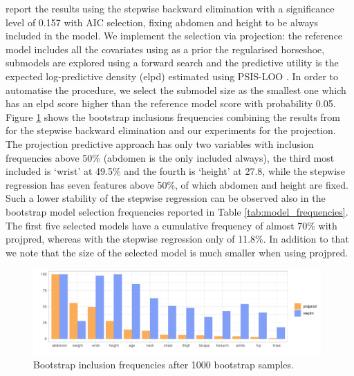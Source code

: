 \documentclass[american,]{article}
\theoremstyle{definition}
\begin{document}
\cite{paper:bodyfat} report the results using the stepwise backward elimination with a significance level of 0.157 with AIC selection, fixing abdomen and height to be always included in the model. We implement the selection via projection: the reference model includes all the covariates using as a prior the regularised horseshoe, submodels are explored using a forward search and the predictive utility is the expected log-predictive density (elpd) estimated using PSIS-LOO \citep{paper:psis_loo}. In order to automatise the procedure, we select the submodel size as the smallest one which has an elpd score higher than the reference model score with probability 0.05. Figure \ref{fig:inclusion_frequencies} shows the bootstrap inclusions frequencies combining the results from \cite{paper:bodyfat} for the stepwise backward elimination and our experiments for the projection. The projection predictive approach has only two variables with inclusion frequencies above 50\% (abdomen is the only included always), the third most included is `wrist' at 49.5\% and the fourth is `height' at 27.8, while the stepwise regression has seven features above 50\%, of which abdomen and height are fixed. Such a lower stability of the stepwise regression can be observed also in the bootstrap model selection frequencies reported in Table \ref{tab:model_frequencies}. The first five selected models have a cumulative frequency of almost 70\% with projpred, whereas with the stepwise regression only of 11.8\%. In addition to that we note that the size of the selected model is much smaller when using projpred.

\begin{figure}[tp]
  \centering
  \includegraphics[width=0.98\textwidth]{graphics/inc_prob.pdf}
  \caption{Bootstrap inclusion frequencies after 1000 bootstrap samples.}
  \label{fig:inclusion_frequencies}
\end{figure}
\end{document}
